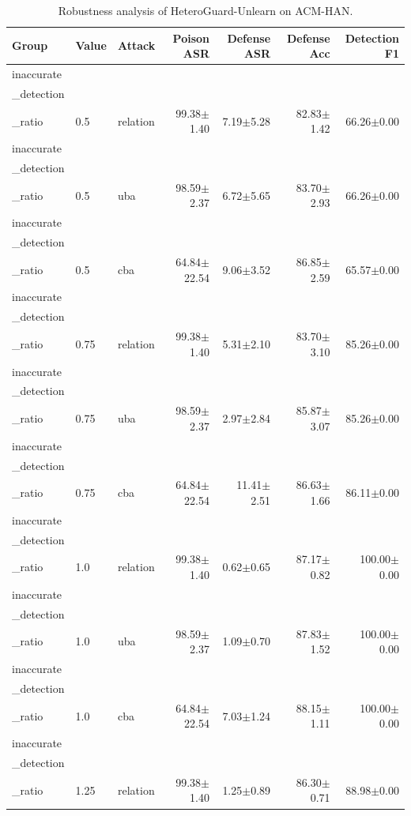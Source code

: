 \begin{table}[t]
\centering
\caption{Robustness analysis of HeteroGuard-Unlearn on ACM-HAN.}
\label{tab:robustness_acm_han}
\begin{tabular}{lllrrrr}
\toprule
Group & Value & Attack & Poison ASR & Defense ASR & Defense Acc & Detection F1 \\
\midrule
inaccurate\\_detection\\_ratio & 0.5 & relation & 99.38$\pm$1.40 & 7.19$\pm$5.28 & 82.83$\pm$1.42 & 66.26$\pm$0.00 \\
inaccurate\\_detection\\_ratio & 0.5 & uba & 98.59$\pm$2.37 & 6.72$\pm$5.65 & 83.70$\pm$2.93 & 66.26$\pm$0.00 \\
inaccurate\\_detection\\_ratio & 0.5 & cba & 64.84$\pm$22.54 & 9.06$\pm$3.52 & 86.85$\pm$2.59 & 65.57$\pm$0.00 \\
inaccurate\\_detection\\_ratio & 0.75 & relation & 99.38$\pm$1.40 & 5.31$\pm$2.10 & 83.70$\pm$3.10 & 85.26$\pm$0.00 \\
inaccurate\\_detection\\_ratio & 0.75 & uba & 98.59$\pm$2.37 & 2.97$\pm$2.84 & 85.87$\pm$3.07 & 85.26$\pm$0.00 \\
inaccurate\\_detection\\_ratio & 0.75 & cba & 64.84$\pm$22.54 & 11.41$\pm$2.51 & 86.63$\pm$1.66 & 86.11$\pm$0.00 \\
inaccurate\\_detection\\_ratio & 1.0 & relation & 99.38$\pm$1.40 & 0.62$\pm$0.65 & 87.17$\pm$0.82 & 100.00$\pm$0.00 \\
inaccurate\\_detection\\_ratio & 1.0 & uba & 98.59$\pm$2.37 & 1.09$\pm$0.70 & 87.83$\pm$1.52 & 100.00$\pm$0.00 \\
inaccurate\\_detection\\_ratio & 1.0 & cba & 64.84$\pm$22.54 & 7.03$\pm$1.24 & 88.15$\pm$1.11 & 100.00$\pm$0.00 \\
inaccurate\\_detection\\_ratio & 1.25 & relation & 99.38$\pm$1.40 & 1.25$\pm$0.89 & 86.30$\pm$0.71 & 88.98$\pm$0.00 \\

\end{tabular}
\end{table}
